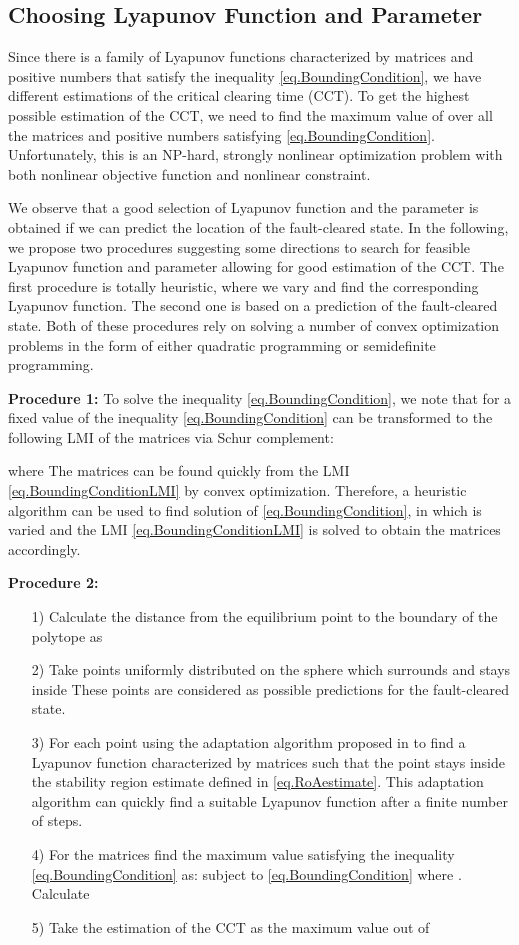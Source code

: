 \documentclass[final]{IEEEtran}
\begin{document}
\subsection{Choosing Lyapunov Function and
Parameter } Since there is a family of Lyapunov functions
 characterized by matrices  and positive numbers
 that satisfy the inequality \eqref{eq.BoundingCondition},
we have different estimations  of
the critical clearing time (CCT). To get the highest possible
estimation of the CCT, we need to find the maximum value of
 over all the matrices  and
positive numbers  satisfying \eqref{eq.BoundingCondition}.
Unfortunately, this is an NP-hard, strongly nonlinear optimization
problem with both nonlinear objective function and nonlinear
constraint.

We observe that a good selection of Lyapunov function and the
parameter  is obtained if we can predict the location of
the fault-cleared state. In the following, we propose two
procedures  suggesting some directions to search for feasible
Lyapunov function and parameter  allowing for good
estimation of the CCT. The first procedure is totally heuristic,
where we vary  and find the corresponding Lyapunov
function. The second one is based on a prediction of the
fault-cleared state. Both of these procedures rely on solving a
number of convex optimization problems in the form of either
quadratic programming or semidefinite programming.

\textbf{Procedure 1:} To solve the inequality
\eqref{eq.BoundingCondition}, we note that for a fixed value of
 the inequality \eqref{eq.BoundingCondition} can be
transformed to the following LMI of the matrices  via Schur
complement:

  where 
The matrices  can be found quickly from the LMI
\eqref{eq.BoundingConditionLMI} by convex optimization. Therefore,
a heuristic algorithm can be used to find solution of
\eqref{eq.BoundingCondition}, in which  is varied and the
LMI \eqref{eq.BoundingConditionLMI} is solved to obtain the
matrices  accordingly.

\textbf{Procedure 2:}
\begin{itemize}
\item [1)] Calculate the distance  from the equilibrium point  to the boundary of the polytope  as 
\item [2)] Take  points  uniformly distributed on the sphere  which surrounds  and stays inside  These points are considered as possible predictions for the fault-cleared state.
\item [3)] For each point  using the adaptation algorithm proposed in \cite{Vu:2014} to find a Lyapunov function  characterized by matrices  such that the point  stays inside the stability region estimate  defined in \eqref{eq.RoAestimate}. This adaptation algorithm can quickly find a suitable Lyapunov function after a finite number of steps.
\item [4)] For the matrices  find the maximum value  satisfying the inequality \eqref{eq.BoundingCondition} as:  subject to \eqref{eq.BoundingCondition} where . Calculate 
\item [5)] Take the estimation of the CCT as the maximum value out of 
\end{itemize}
\end{document}
